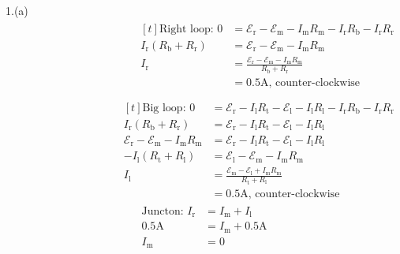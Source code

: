 \documentclass[11pt]{article}
\begin{document}
1.(a)
\begin{align*}
\begin{aligned}[t]
\text{Right loop: }
0 &= \mathcal{E}_\mathrm{r} - \mathcal{E}_\mathrm{m} - I_\mathrm{m}R_\mathrm{m} - I_\mathrm{r}R_\mathrm{b} - I_\mathrm{r}R_\mathrm{r} \\
I_\mathrm{r} (R_\mathrm{b} + R_\mathrm{r}) &= \mathcal{E}_\mathrm{r} - \mathcal{E}_\mathrm{m} - I_\mathrm{m}R_\mathrm{m} \\
I_\mathrm{r} &= \frac{\mathcal{E}_\mathrm{r} - \mathcal{E}_\mathrm{m} - I_\mathrm{m}R_\mathrm{m}}{R_\mathrm{b} + R_\mathrm{r}} \\
    &= 0.5\mathrm{A} \text{, counter-clockwise} \\ \\
\end{aligned}
\begin{aligned} [t]
\text{Big loop: }
0 &= \mathcal{E}_\mathrm{r} - I_\mathrm{l}R_\mathrm{t} - \mathcal{E}_\mathrm{l} - I_\mathrm{l}R_\mathrm{l} - I_\mathrm{r}R_\mathrm{b} - I_\mathrm{r}R_\mathrm{r} \\
I_\mathrm{r} (R_\mathrm{b} + R_\mathrm{r}) &= \mathcal{E}_\mathrm{r} - I_\mathrm{l}R_\mathrm{t} - \mathcal{E}_\mathrm{l} - I_\mathrm{l}R_\mathrm{l} \\
\mathcal{E}_\mathrm{r} - \mathcal{E}_\mathrm{m} - I_\mathrm{m}R_\mathrm{m} &= \mathcal{E}_\mathrm{r} - I_\mathrm{l}R_\mathrm{t} - \mathcal{E}_\mathrm{l} - I_\mathrm{l}R_\mathrm{l} \\
- I_\mathrm{l} (R_\mathrm{t} + R_\mathrm{l}) &= \mathcal{E}_\mathrm{l} - \mathcal{E}_\mathrm{m} - I_\mathrm{m}R_\mathrm{m} \\
I_\mathrm{l} &= \frac{\mathcal{E}_\mathrm{m} - \mathcal{E}_\mathrm{l} + I_\mathrm{m}R_\mathrm{m}}{R_\mathrm{t} + R_\mathrm{l}} \\
             &= 0.5 \mathrm{A} \text{, counter-clockwise}
\end{aligned}
\end{align*}
\begin{align*}
\text{Juncton: }
I_{\mathrm{r}} &= I_{\mathrm{m}} + I_{\mathrm{l}} \\
0.5 \mathrm{A} &= I_{\mathrm{m}} + 0.5 \mathrm{A} \\
I_{\mathrm{m}} &= 0
\end{align*}
\end{document}
